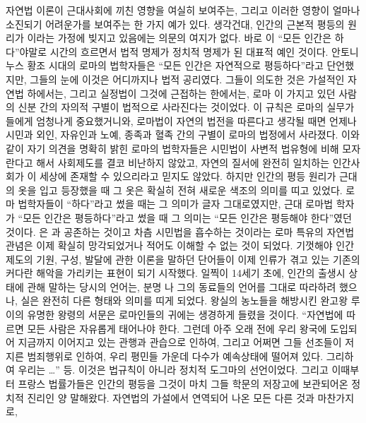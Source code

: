 자연법 이론이
근대사회에 끼친 영향을 여실히 보여주는,
그리고 이러한 영향이 얼마나 소진되기 어려운가를 보여주는
한 가지 예가 있다.
생각건대,
인간의 근본적 평등의 원리가
이라는 가정에
빚지고 있음에는 의문의 여지가 없다.
바로 이 ``모든 인간은 하다''야말로
시간의 흐르면서 법적 명제가 정치적 명제가 된
대표적 예인 것이다.
안토니누스 황조 시대의 로마의 법학자들은
``모든 인간은 자연적으로 평등하다''라고 단언했지만,
그들의 눈에 이것은 어디까지나 법적 공리였다.
그들이 의도한 것은
가설적인 자연법 하에서는, 그리고 실정법이 그것에 근접하는 한에서는,
로마 이 가지고 있던 사람의 신분 간의 자의적 구별이
법적으로 사라진다는 것이었다.
이 규칙은 로마의 실무가들에게 엄청나게 중요했거니와,
로마법이 자연의 법전을 따른다고 생각될 때면 언제나
시민과 외인, 자유인과 노예,
종족과 혈족 간의 구별이
로마의 법정에서 사라졌다.
이와 같이 자기 의견을 명확히 밝힌 로마의 법학자들은
시민법이 사변적 법유형에 비해 모자란다고 해서 사회제도를
결코 비난하지 않았고, 자연의 질서에 완전히 일치하는
인간사회가 이 세상에 존재할 수 있으리라고 믿지도 않았다.
하지만 인간의 평등 원리가 근대의 옷을 입고 등장했을 때
그 옷은 확실히 전혀 새로운 색조의 의미를 띠고 있었다.
로마 법학자들이 ``하다''라고 썼을 때는
그 의미가 글자 그대로였지만,
근대 로마법 학자가 ``모든 인간은 평등하다''라고 썼을 때
그 의미는 ``모든 인간은 평등해야 한다''였던 것이다.
은 과 공존하는 것이고 차츰 시민법을 흡수하는 것이라는
로마 특유의 자연법 관념은 이제 확실히 망각되었거나
적어도 이해할 수 없는 것이 되었다.
기껏해야 인간 제도의 기원, 구성, 발달에 관한 이론을 말하던 단어들이
이제
인류가 겪고 있는 기존의 커다란 해악을 가리키는 표현이 되기 시작했다.
일찍이 14세기 초에, 인간의 출생시 상태에 관해 말하는 당시의 언어는,
분명 나 그의 동료들의 언어를 그대로 따라하려 했으나,
실은 완전히 다른 형태와 의미를 띠게 되었다.
왕실의 농노들을 해방시킨
완고왕 루이의 유명한 왕령의 서문은
로마인들의 귀에는 생경하게 들렸을 것이다.
``자연법에 따르면 모든 사람은 자유롭게
태어나야 한다.
그런데 아주 오래 전에 우리 왕국에 도입되어
지금까지 이어지고 있는 관행과 관습으로 인하여,
그리고 어쩌면 그들 선조들이 저지른 범죄행위로 인하여,
우리 평민들 가운데 다수가 예속상태에 떨어져 있다. 그리하여 우리는 \ldots'' 등.
이것은 법규칙이 아니라 정치적 도그마의 선언이었다.
그리고 이때부터 프랑스 법률가들은 인간의 평등을
그것이 마치 그들 학문의 저장고에 보관되어온 정치적 진리인 양 말해왔다.
자연법의 가설에서 연역되어 나온 모든 다른 것과 마찬가지로,
